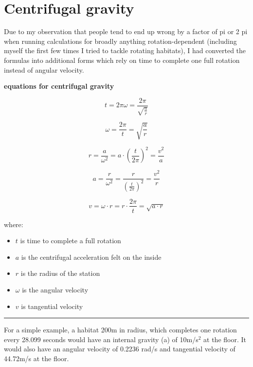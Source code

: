 \documentclass[a4paper]{article}
\begin{document}
	\vfill
	
	\tableofcontents
	
	\pagebreak
	
	\section{Centrifugal gravity}
	
	Due to my observation that people tend to end up wrong by a factor of pi or 2 pi when running calculations for broadly anything rotation-dependent (including myself the first few times I tried to tackle rotating habitats), I had converted the formulas into additional forms which rely on time to complete one full rotation instead of angular velocity.
	
	\begin{center}
		\textbf{equations for centrifugal gravity}
	\end{center}
	
	$$ t = 2\pi\omega = \frac{2 \pi}{\sqrt{\frac{a}{r}}} $$
	
	$$ \omega = \frac{2 \pi}{t} = \sqrt{\frac{a}{r}} $$
	
	$$ r =  \frac{a}{\omega^2}= a \cdot \left( \frac{t}{2 \pi} \right)^2 = \frac{v^2}{a}$$
	
	$$ a = \frac{r}{\omega^2} = \frac{r}{\left( \frac{t}{2 \pi} \right)^2} = \frac{v^2}{r}$$
	
	$$ v = \omega \cdot r = r \cdot \frac{2 \pi}{t} = \sqrt{a \cdot r}$$
	
	where:
	
	\begin{itemize}
		\item $t$ is time to complete a full rotation
		
		\item $a$ is the centrifugal acceleration felt on the inside
		
		\item $r$ is the radius of the station
		
		\item $\omega$ is the angular velocity
		
		\item $v$ is tangential velocity
	\end{itemize}
	
	\medskip
	
	\noindent \rule{\linewidth}{1pt}
	
	\medskip
	
	For a simple example, a habitat 200m in radius, which completes one rotation every 28.099 seconds would have an internal gravity (a) of 10m/s$^2$ at the floor. It would also have an angular velocity of 0.2236 rad/s and tangential velocity of 44.72m/s at the floor.
	
\end{document}
